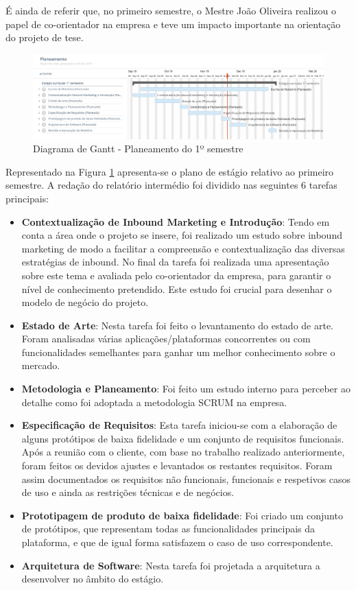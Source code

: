 É ainda de referir que, no primeiro semestre, o Mestre João Oliveira realizou o papel de co-orientador na empresa e teve um impacto importante na orientação do projeto de tese. 

\begin{figure}[ht!]
	\begin{center}
		\includegraphics[width=1\textwidth]{img/gantt/semestre1.jpeg}
		\caption{Diagrama de Gantt - Planeamento do 1º semestre}
		\label{fig:gantt1}
	\end{center}
\end{figure}

Representado na Figura \ref{fig:gantt1} apresenta-se o plano de estágio relativo ao primeiro semestre. A redação do relatório intermédio foi dividido nas seguintes 6 tarefas principais:
\begin{itemize}
	\item \textbf{Contextualização de Inbound Marketing e Introdução}: Tendo em conta a área onde o projeto se insere, foi realizado um estudo sobre inbound marketing de modo a  facilitar a compreensão e contextualização das diversas estratégias de inbound. No final da tarefa foi realizada uma apresentação sobre este tema e avaliada pelo co-orientador da empresa, para garantir o nível de conhecimento pretendido. Este estudo foi crucial para desenhar o modelo de negócio do projeto.
	\item \textbf{Estado de Arte}: Nesta tarefa foi feito o levantamento do estado de arte. Foram analisadas várias aplicações/plataformas concorrentes ou com funcionalidades semelhantes para ganhar um melhor conhecimento sobre o mercado.
	\item \textbf{Metodologia e Planeamento}: Foi feito um estudo interno para perceber ao detalhe como foi adoptada a metodologia SCRUM na empresa.
	\item \textbf{Especificação de Requisitos}: Esta tarefa iniciou-se com a elaboração de alguns protótipos de baixa fidelidade e um conjunto de requisitos funcionais. Após a reunião com o cliente, com base no trabalho realizado anteriormente, foram feitos os devidos ajustes e levantados os restantes requisitos. Foram assim documentados os requisitos não funcionais, funcionais e respetivos casos de uso e ainda as restrições técnicas e de negócios.
	\item \textbf{Prototipagem de produto de baixa fidelidade}: Foi criado um conjunto de protótipos, que representam todas as funcionalidades principais da plataforma, e que de igual forma satisfazem o caso de uso correspondente.
	\item \textbf{Arquitetura de Software}: Nesta tarefa foi projetada a arquitetura a desenvolver no âmbito do estágio.
\end{itemize}

